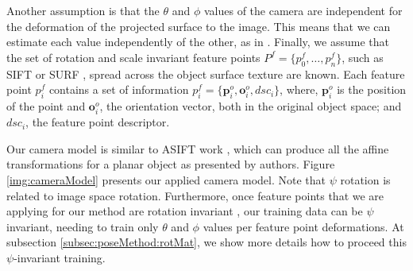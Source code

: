 \documentclass[annual]{acmsiggraph}
\begin{document}
Another assumption is that the $\theta$ and $\phi$ values of the camera are independent for the deformation of the projected surface to the image. This means that we can estimate each value independently of the other, as in \cite{Fenzi:2013}. Finally, we assume that the set of rotation and scale invariant feature points $P^f = \{ p^f_0, \ldots, p^f_n \}$, such as SIFT \cite{Lowe:1999} or SURF \cite{Bay:2008}, spread across the object surface texture are known. Each feature point $p^f_i$ contains a set of information $p^f_i = \{ \mathbf{p}^o_i, \mathbf{o}^o_i, dsc_i \}$, where, $\mathbf{p}^o_i$ is the position of the point and $\mathbf{o}^o_i$, the orientation vector, both in the original object space; and $dsc_i$, the feature point descriptor. 

Our camera model is similar to ASIFT work \cite{Morel:2009}, which can produce all the affine transformations for a planar object as presented by authors. Figure \ref{img:cameraModel} presents our applied camera model. Note that $\psi$ rotation is related to image space rotation. Furthermore, once feature points that we are applying for our method are rotation invariant \cite{Bay:2008}, our training data can be $\psi$ invariant, needing to train only $\theta$ and $\phi$ values per feature point deformations. At subsection \ref{subsec:poseMethod:rotMat}, we show more details how to proceed this $\psi$-invariant training.   
\end{document}
